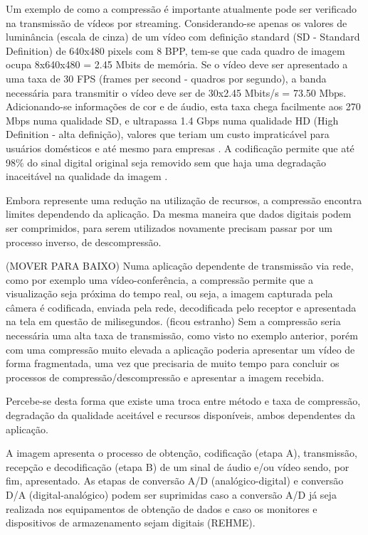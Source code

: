 Um exemplo de como a compressão é importante atualmente pode ser verificado na transmissão de vídeos por streaming. Considerando-se apenas os valores de luminância (escala de cinza) de um vídeo com definição standard (SD - Standard Definition) de 640x480 pixels com 8 BPP, tem-se que cada quadro de imagem ocupa 8x640x480 = 2.45 Mbits de memória. Se o vídeo deve ser apresentado a uma taxa de 30 FPS (frames per second - quadros por segundo), a banda necessária para transmitir o vídeo deve ser de 30x2.45 Mbits/s = 73.50 Mbps. Adicionando-se informações de cor e de áudio, esta taxa chega facilmente aos 270 Mbps numa qualidade SD, e ultrapassa 1.4 Gbps numa qualidade HD (High Definition - alta definição), valores que teriam um custo impraticável para usuários domésticos e até mesmo para empresas \cite{ciscoieee}. A codificação permite que até 98\% do sinal digital original seja removido sem que haja uma degradação inaceitável na qualidade da imagem \cite{mpeg2ref}.

Embora represente uma redução na utilização de recursos, a compressão encontra limites dependendo da aplicação. Da mesma maneira que dados digitais podem ser comprimidos, para serem utilizados novamente precisam passar por um processo inverso, de descompressão.

(MOVER PARA BAIXO) Numa aplicação dependente de transmissão via rede, como por exemplo uma vídeo-conferência, a compressão permite que a visualização seja próxima do tempo real, ou seja, a imagem capturada pela câmera é codificada, enviada pela rede, decodificada pelo receptor e apresentada na tela em questão de milisegundos. (ficou estranho) Sem a compressão seria necessária uma alta taxa de transmissão, como visto no exemplo anterior, porém com uma compressão muito elevada a aplicação poderia apresentar um vídeo de forma fragmentada, uma vez que precisaria de muito tempo para concluir os processos de compressão/descompressão e apresentar a imagem recebida.

Percebe-se desta forma que existe uma troca entre método e taxa de compressão, degradação da qualidade aceitável e recursos disponíveis, ambos dependentes da aplicação.

A imagem apresenta o processo de obtenção, codificação (etapa A), transmissão, recepção e decodificação (etapa B) de um sinal de áudio e/ou vídeo sendo, por fim, apresentado. As etapas de conversão A/D (analógico-digital) e conversão D/A (digital-analógico) podem ser suprimidas caso a conversão A/D já seja realizada nos equipamentos de obtenção de dados e caso os monitores e dispositivos de armazenamento sejam digitais (REHME).

